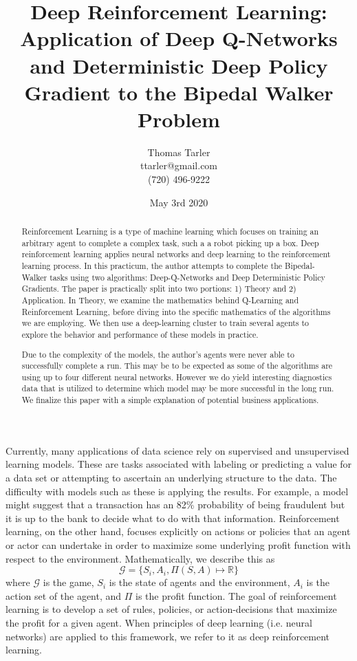 \documentclass[doc, onecolumn, 12pt]{apa6}
\title{Deep Reinforcement Learning: Application of Deep Q-Networks and Deterministic Deep Policy Gradient to the Bipedal Walker Problem}
\affiliation{Regis University}
\author{Thomas Tarler\\ ttarler@gmail.com \\ (720) 496-9222}
\date{May  3rd 2020}
\begin{document}
\maketitle

\begin{abstract}


Reinforcement Learning is a type of machine learning which focuses on training an arbitrary agent to complete a complex task, such a a robot picking up a box. Deep reinforcement learning applies neural networks and deep learning to the reinforcement learning process. In this practicum, the author attempts to complete the Bipedal-Walker tasks using two algorithms: Deep-Q-Networks and Deep Deterministic Policy Gradients. The paper is practically split into two portions: 1) Theory and 2) Application. In Theory, we examine the mathematics behind Q-Learning and Reinforcement Learning, before diving into the specific mathematics of the algorithms we are employing. We then use a deep-learning cluster to train several agents to explore the behavior and performance of these models in practice. 

Due to the complexity of the models, the author's agents were never able to successfully complete a run. This may be to be expected as some of the algorithms are using up to four different neural networks. However we do yield interesting diagnostics data that is utilized to determine which model may be more successful in the long run. We finalize this paper with a simple explanation of potential business applications. 


\end{abstract}
\newpage
\tableofcontents
\newpage
\listoffigures
\newpage

Currently, many applications of data science rely on supervised and unsupervised learning models. These are tasks associated with labeling or predicting a value for a data set or attempting to ascertain an underlying structure to the data. The difficulty with models such as these is applying the results. For example, a model might suggest that a transaction has an 82\% probability of being fraudulent but it is up to the bank to decide what to do with that information. Reinforcement learning, on the other hand, focuses explicitly on actions or policies that an agent or actor can undertake in order to maximize some underlying profit function with respect to the environment. Mathematically, we describe this as \[ \mathcal{G} = \lbrace S_{i}, A_{i}, \Pi(S,A) \mapsto \mathbb{R} \rbrace\] where $\mathcal{G}$ is the game, $S_{i}$ is the state of agents and the environment, $A_{i}$ is the action set of the agent, and $\Pi$ is the profit function. The goal of reinforcement learning is to develop a set of rules, policies, or action-decisions that maximize the profit for a given agent. When principles of deep learning (i.e. neural networks) are applied to this framework, we refer to it as deep reinforcement learning. 
\end{document}
